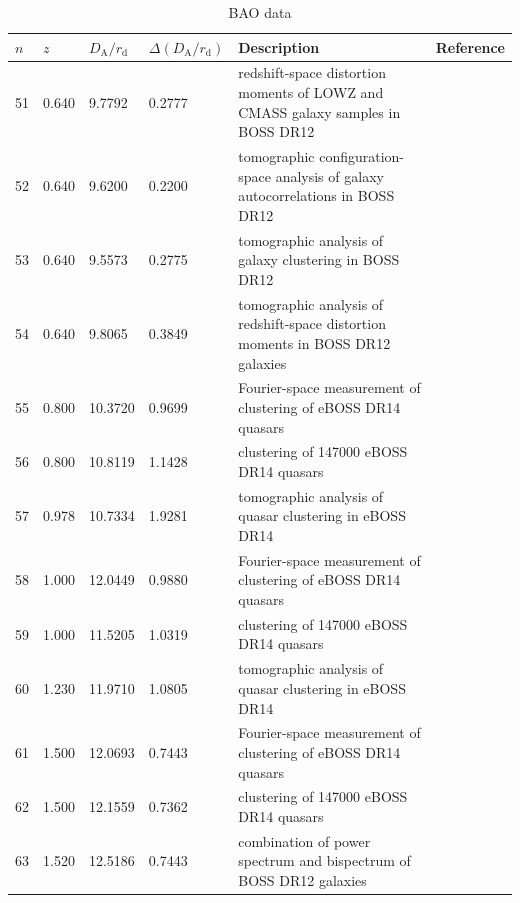 \begin{table}
  \caption{BAO data}
  \label{tab:2a}
  \begin{tabular}{llllp{70mm}l}
    $n$ & $z$ & $D_\mathrm{A}/r_\mathrm{d}$ & $\Delta(D_\mathrm{A}/r_\mathrm{d})$ &
    Description & Reference \\
    \hline
    51 & 0.640 &  9.7792 & 0.2777 &
    redshift-space distortion moments of LOWZ and CMASS galaxy samples in BOSS DR12 &
    \cite{2017MNRAS.471.2370C} \\
    52 & 0.640 &  9.6200 & 0.2200 &
    tomographic configuration-space analysis of galaxy autocorrelations in BOSS DR12 &
    \cite{2017MNRAS.469.3762W} \\
    53 & 0.640 &  9.5573 & 0.2775 &
    tomographic analysis of galaxy clustering in BOSS DR12 &
    \cite{2018MNRAS.481.3160W} \\
    54 & 0.640 &  9.8065 & 0.3849 &
    tomographic analysis of redshift-space distortion moments in BOSS DR12 galaxies &
    \cite{2017MNRAS.466..762Z} \\
    55 & 0.800 & 10.3720 & 0.9699 &
    Fourier-space measurement of clustering of eBOSS DR14 quasars &
    \cite{2018MNRAS.477.1528W} \\
    56 & 0.800 & 10.8119 & 1.1428 &
    clustering of 147000 eBOSS DR14 quasars &
    \cite{2018MNRAS.480.1096Z} \\
    57 & 0.978 & 10.7334 & 1.9281 &
    tomographic analysis of quasar clustering in eBOSS DR14 &
    \cite{2019MNRAS.482.3497Z} \\
    58 & 1.000 & 12.0449 & 0.9880 &
    Fourier-space measurement of clustering of eBOSS DR14 quasars &
    \cite{2018MNRAS.477.1528W} \\
    59 & 1.000 & 11.5205 & 1.0319 &
    clustering of 147000 eBOSS DR14 quasars &
    \cite{2018MNRAS.480.1096Z} \\
    60 & 1.230 & 11.9710 & 1.0805 &
    tomographic analysis of quasar clustering in eBOSS DR14 &
    \cite{2019MNRAS.482.3497Z} \\
    61 & 1.500 & 12.0693 & 0.7443 &
    Fourier-space measurement of clustering of eBOSS DR14 quasars &
    \cite{2018MNRAS.477.1528W} \\
    62 & 1.500 & 12.1559 & 0.7362 &
    clustering of 147000 eBOSS DR14 quasars &
    \cite{2018MNRAS.480.1096Z} \\
    63 & 1.520 & 12.5186 & 0.7443 &
    combination of power spectrum and bispectrum of BOSS DR12 galaxies &
    \cite{2017MNRAS.465.1757G} \\

\end{tabular}
\end{table}
